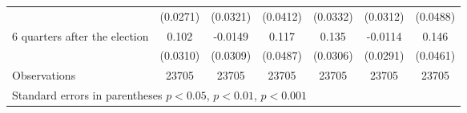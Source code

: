 \begin{table}[!ht]
\begin{tabular}{l*{6}{c}}
                    &    (0.0271)         &    (0.0321)         &    (0.0412)         &    (0.0332)         &    (0.0312)         &    (0.0488)         \\
[0.5em]
 6 quarters after the election&       0.102\sym{***}&     -0.0149         &       0.117\sym{*}  &       0.135\sym{***}&     -0.0114         &       0.146\sym{**} \\
                    &    (0.0310)         &    (0.0309)         &    (0.0487)         &    (0.0306)         &    (0.0291)         &    (0.0461)         \\
\hline
Observations        &       23705         &       23705         &       23705         &       23705         &       23705         &       23705         \\
\hline\hline
\multicolumn{7}{l}{ Standard errors in parentheses \sym{*} \(p<0.05\), \sym{**} \(p<0.01\), \sym{***} \(p<0.001\)}\\
\end{tabular}
\end{table}
